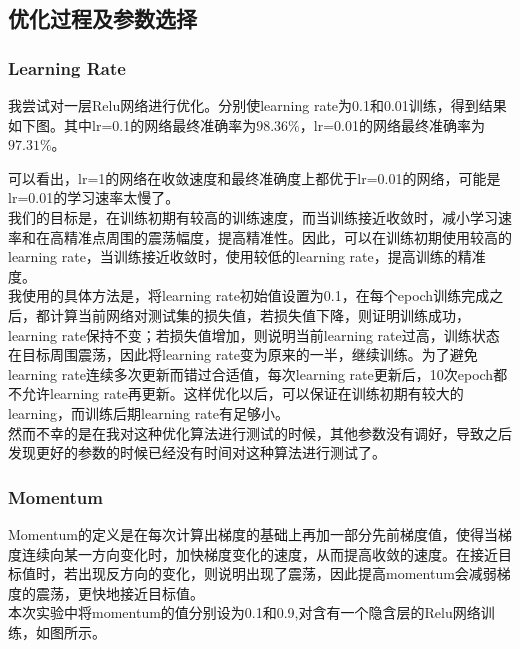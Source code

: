 \documentclass[11pt,utf8]{article}
\begin{document}
        \subsection*{优化过程及参数选择}
          \subsubsection*{Learning Rate}
            \indent 我尝试对一层Relu网络进行优化。分别使learning rate为0.1和0.01训练，得到结果如下图。其中lr=0.1的网络最终准确率为$98.36\%$，lr=0.01的网络最终准确率为$97.31\%$。 \\
            \begin{center}
              \vspace{2em}
            \end{center}
            \indent \indent 可以看出，lr=1的网络在收敛速度和最终准确度上都优于lr=0.01的网络，可能是lr=0.01的学习速率太慢了。\\
            \indent 我们的目标是，在训练初期有较高的训练速度，而当训练接近收敛时，减小学习速率和在高精准点周围的震荡幅度，提高精准性。因此，可以在训练初期使用较高的learning rate，当训练接近收敛时，使用较低的learning rate，提高训练的精准度。\\
            \indent 我使用的具体方法是，将learning rate初始值设置为0.1，在每个epoch训练完成之后，都计算当前网络对测试集的损失值，若损失值下降，则证明训练成功，learning rate保持不变；若损失值增加，则说明当前learning rate过高，训练状态在目标周围震荡，因此将learning rate变为原来的一半，继续训练。为了避免learning rate连续多次更新而错过合适值，每次learning rate更新后，10次epoch都不允许learning rate再更新。这样优化以后，可以保证在训练初期有较大的learning，而训练后期learning rate有足够小。\\
            \indent 然而不幸的是在我对这种优化算法进行测试的时候，其他参数没有调好，导致之后发现更好的参数的时候已经没有时间对这种算法进行测试了。\\
          \subsubsection*{Momentum}
            \indent Momentum的定义是在每次计算出梯度的基础上再加一部分先前梯度值，使得当梯度连续向某一方向变化时，加快梯度变化的速度，从而提高收敛的速度。在接近目标值时，若出现反方向的变化，则说明出现了震荡，因此提高momentum会减弱梯度的震荡，更快地接近目标值。\\
            \indent 本次实验中将momentum的值分别设为0.1和0.9,对含有一个隐含层的Relu网络训练，如图所示。\\
            \begin{center}
              \vspace{2em}
            \end{center}
\end{document}
